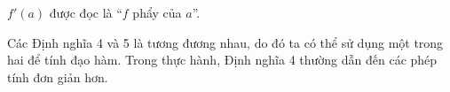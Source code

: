 \noindent
\begin{minipage}[t]{0.25\textwidth}
\vspace{0pt}
\vspace{228pt}
{\raggedright\fontsize{8.5}{11}\selectfont $f'(a)$ được đọc là “$f$ phẩy của $a$”.\par}

\vspace{190pt}
{\raggedright\fontsize{8.5}{11}\selectfont Các Định nghĩa 4 và 5 là tương đương nhau, do đó ta có thể sử dụng một trong hai để tính đạo hàm. Trong thực hành, Định nghĩa 4 thường dẫn đến các phép tính đơn giản hơn.\par}
\end{minipage}%
\hfill
